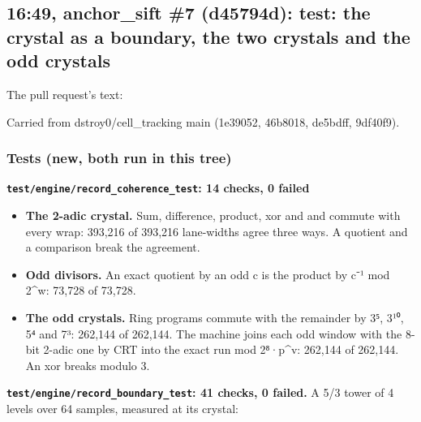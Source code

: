 \subsection{\texorpdfstring{16:49, anchor\_\allowbreak{}sift \#7 (d45794d): test: the crystal as a boundary, the two crystals and the odd crystals}{16:49, anchor\_sift \#7 (d45794d): test: the crystal as a boundary, the two crystals and the odd crystals}}

The pull request's text:

Carried from dstroy0/cell\_\allowbreak{}tracking main (1e39052, 46b8018, de5bdff, 9df40f9).

\subsubsection{\texorpdfstring{Tests (new, both run in this tree)}{Tests (new, both run in this tree)}}

\textbf{\texttt{test/\allowbreak{}engine/\allowbreak{}record\_\allowbreak{}coherence\_\allowbreak{}test}: 14 checks, 0 failed}

\begin{itemize}
\item \textbf{The 2-adic crystal.} Sum, difference, product, xor and and commute with every wrap: 393,216 of 393,216 lane-widths agree three ways. A quotient and a comparison break the agreement.
\item \textbf{Odd divisors.} An exact quotient by an odd c is the product by c⁻¹ mod 2\textasciicircum{}w: 73,728 of 73,728.
\item \textbf{The odd crystals.} Ring programs commute with the remainder by 3⁵, 3¹⁰, 5⁴ and 7³: 262,144 of 262,144. The machine joins each odd window with the 8-bit 2-adic one by CRT into the exact run mod 2⁸·p\textasciicircum{}v: 262,144 of 262,144. An xor breaks modulo 3.
\end{itemize}

\textbf{\texttt{test/\allowbreak{}engine/\allowbreak{}record\_\allowbreak{}boundary\_\allowbreak{}test}: 41 checks, 0 failed.} A 5/3 tower of 4 levels over 64 samples, measured at its crystal:

